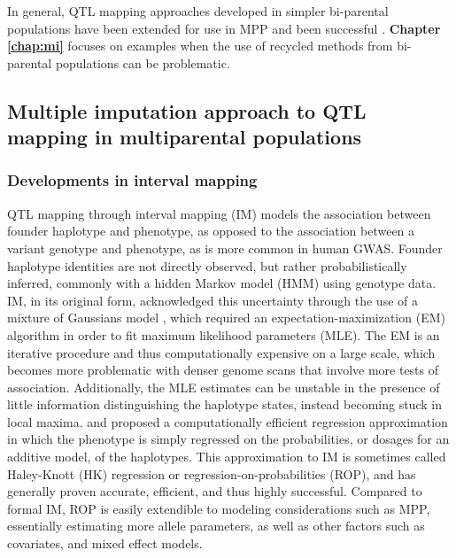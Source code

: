 In general, QTL mapping approaches developed in simpler bi-parental populations have been extended for use in MPP and been successful \citep{Valdar2006b,Valdar2006a,Valdar2009,Svenson2012,Baud2013,Baud2014,Gatti2014,Phillippi2014}. \textbf{Chapter \ref{chap:mi}} focuses on examples when the use of recycled methods from bi-parental populations can be problematic.

\subsection{Multiple imputation approach to QTL mapping in multiparental populations}

\subsubsection{Developments in interval mapping}

QTL mapping through interval mapping (IM) \citep{Lander1989} models the association between founder haplotype and phenotype, as opposed to the association between a variant genotype and phenotype, as is more common in human GWAS. Founder haplotype identities are not directly observed, but rather probabilistically inferred, commonly with a hidden Markov model (HMM) \citep{Lander1987,Mott2000,Liu2010,Fu2012,Gatti2014,Zheng2015} using genotype data. IM, in its original form, acknowledged this uncertainty through the use of a mixture of Gaussians model \citep{Broman2009}, which required an expectation-maximization (EM) algorithm \citep{Dempster1977} in order to fit maximum likelihood parameters (MLE). The EM is an iterative procedure and thus computationally expensive on a large scale, which becomes more problematic with denser genome scans that involve more tests of association. Additionally, the MLE estimates can be unstable in the presence of little information distinguishing the haplotype states, instead becoming stuck in local maxima. \cite{Haley1992} and \cite{Martinez1992} proposed a computationally efficient regression approximation in which the phenotype is simply regressed on the probabilities, or dosages for an additive model, of the haplotypes. This approximation to IM is sometimes called Haley-Knott (HK) regression or regression-on-probabilities (ROP), and has generally proven accurate, efficient, and thus highly successful. Compared to formal IM, ROP is easily extendible to modeling considerations such as MPP, essentially estimating more allele parameters, as well as other factors such as covariates, and mixed effect models. 

